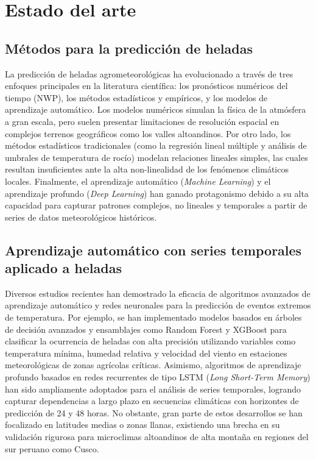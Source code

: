 \section{Estado del arte}
\label{sec:estadoarte}

\subsection{Métodos para la predicción de heladas}
La predicción de heladas agrometeorológicas ha evolucionado a través de tres enfoques principales en la literatura científica: los pronósticos numéricos del tiempo (NWP), los métodos estadísticos y empíricos, y los modelos de aprendizaje automático. Los modelos numéricos simulan la física de la atmósfera a gran escala, pero suelen presentar limitaciones de resolución espacial en complejos terrenos geográficos como los valles altoandinos. Por otro lado, los métodos estadísticos tradicionales (como la regresión lineal múltiple y análisis de umbrales de temperatura de rocío) modelan relaciones lineales simples, las cuales resultan insuficientes ante la alta non-linealidad de los fenómenos climáticos locales. Finalmente, el aprendizaje automático (\textit{Machine Learning}) y el aprendizaje profundo (\textit{Deep Learning}) han ganado protagonismo debido a su alta capacidad para capturar patrones complejos, no lineales y temporales a partir de series de datos meteorológicos históricos.

\subsection{Aprendizaje automático con series temporales aplicado a heladas}
Diversos estudios recientes han demostrado la eficacia de algoritmos avanzados de aprendizaje automático y redes neuronales para la predicción de eventos extremos de temperatura. Por ejemplo, se han implementado modelos basados en árboles de decisión avanzados y ensamblajes como Random Forest y XGBoost para clasificar la ocurrencia de heladas con alta precisión utilizando variables como temperatura mínima, humedad relativa y velocidad del viento en estaciones meteorológicas de zonas agrícolas críticas. Asimismo, algoritmos de aprendizaje profundo basados en redes recurrentes de tipo LSTM (\textit{Long Short-Term Memory}) han sido ampliamente adoptados para el análisis de series temporales, logrando capturar dependencias a largo plazo en secuencias climáticas con horizontes de predicción de 24 y 48 horas. No obstante, gran parte de estos desarrollos se han focalizado en latitudes medias o zonas llanas, existiendo una brecha en su validación rigurosa para microclimas altoandinos de alta montaña en regiones del sur peruano como Cusco.

